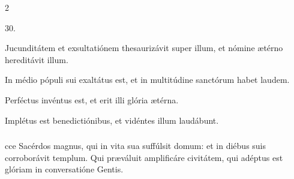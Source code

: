 \documentclass[9pt,twoside]{extarticle}
\begin{document}
\begin{multicols}{2}
\begin{tightlist}{}
\item {} 30.
\item {} Jucunditátem et exsultatiónem thesaurizávit super illum, et nómine ætérno hereditávit illum.
\item {} In médio pópuli sui exaltátus est, et in multitúdine sanctórum habet laudem.
\item {} Perféctus invéntus est, et erit illi glória ætérna.
\item {} Implétus est benedictiónibus, et vidéntes illum laudábunt.
\end{tightlist}

\subsubsection*{}
cce Sacérdos magnus, qui in vita sua suffúlsit domum: et in diébus suis corroborávit templum. Qui præváluit amplificáre civitátem, qui adéptus est glóriam in conversatióne Gentis.


\end{multicols}
\end{document}
